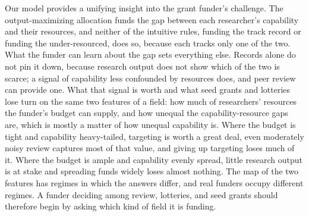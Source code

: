 \documentclass[article, 11pt, reqno]{amsart}
\theoremstyle{named}
\begin{document}
Our model provides a unifying insight into the grant funder's challenge. The output-maximizing allocation funds the gap between each researcher's capability and their resources, and neither of the intuitive rules, funding the track record or funding the under-resourced, does so, because each tracks only one of the two. What the funder can learn about the gap sets everything else. Records alone do not pin it down, because research output does not show which of the two is scarce; a signal of capability less confounded by resources does, and peer review can provide one. What that signal is worth and what seed grants and lotteries lose turn on the same two features of a field: how much of researchers' resources the funder's budget can supply, and how unequal the capability-resource gaps are, which is mostly a matter of how unequal capability is. Where the budget is tight and capability heavy-tailed, targeting is worth a great deal, even moderately noisy review captures most of that value, and giving up targeting loses much of it. Where the budget is ample and capability evenly spread, little research output is at stake and spreading funds widely loses almost nothing. The map of the two features has regimes in which the answers differ, and real funders occupy different regimes. A funder deciding among review, lotteries, and seed grants should therefore begin by asking which kind of field it is funding.

\begin{appendices}






\end{appendices}



\end{document}
